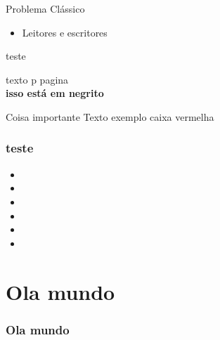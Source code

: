 \documentclass{beamer}
\begin{document}
\begin{frame}{Problema Clássico}
    
	\begin{itemize}
		\item Leitores e escritores
	\end{itemize}
\end{frame}


\begin{frame}
	teste
	
\end{frame}

	\begin{frame}
		texto p pagina \thepage\\
		\textbf{isso está em negrito}

		\begin{alertblock}{Coisa importante}
			Texto exemplo caixa vermelha
		\end{alertblock}
	\end{frame}

	\begin{frame}
		\frametitle{teste}
		\begin{itemize}
			\item 
			\item 
			\item 
			\item 
			\item 
			\item 
		\end{itemize}
	\end{frame}
	\section{Ola mundo}
	\begin{frame}
		\frametitle{Ola mundo}
	\end{frame}
\end{document}
